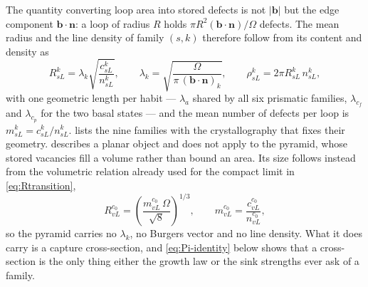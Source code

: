 \documentclass{article}
\newcommand{\bvec}{\bm b}
\newcommand{\nvec}{\bm n}
\begin{document}
The quantity converting loop area into stored defects is not $|\bvec|$ but the
edge component $\bvec\!\cdot\!\nvec$: a loop of radius $R$ holds $\pi
R^2(\bvec\!\cdot\!\nvec)/\Omega$ defects. The mean radius and the line density of
family $(s,k)$ therefore follow from its content and density as
\begin{equation}
  R^k_{sL}=\lambda_k\sqrt{\frac{c^k_{sL}}{n^k_{sL}}},
  \qquad
  \lambda_k=\sqrt{\frac{\Omega}{\pi\,(\bvec\!\cdot\!\nvec)_k}},
  \qquad
  \rho^k_{sL}=2\pi R^k_{sL}\,n^k_{sL},
  \label{eq:radius}
\end{equation}
with one geometric length per habit --- $\lambda_a$ shared by all six prismatic
families, $\lambda_{c_f}$ and $\lambda_{c_p}$ for the two basal states --- and
the mean number of defects per loop is $m^k_{sL}=c^k_{sL}/n^k_{sL}$.
 lists the nine families with the crystallography that
fixes their geometry.
 describes a planar object and does not apply to the pyramid,
whose stored vacancies fill a volume rather than bound an area. Its size follows
instead from the volumetric relation already used for the compact limit in
\cref{eq:Rtransition},
\begin{equation}
  R^{c_0}_{vL}=\left(\frac{m^{c_0}_{vL}\,\Omega}{\sqrt8}\right)^{1/3},
  \qquad
  m^{c_0}_{vL}=\frac{c^{c_0}_{vL}}{n^{c_0}_{vL}},
  \label{eq:Rsfp}
\end{equation}
so the pyramid carries no $\lambda_k$, no Burgers vector and no line density.
What it does carry is a capture cross-section, and \cref{eq:Pi-identity} below
shows that a cross-section is the only thing either the growth law or the sink
strengths ever ask of a family.
\end{document}
